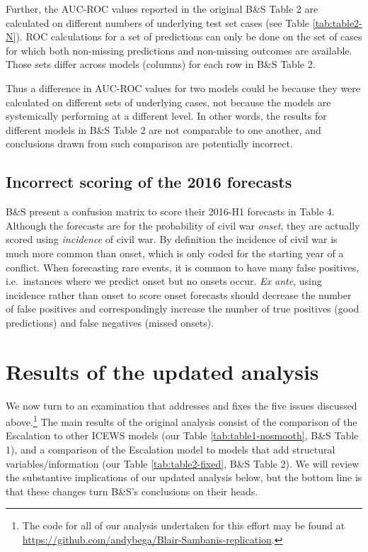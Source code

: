 \documentclass[
]{article}
\begin{document}
Further, the AUC-ROC values reported in the original B\&S Table 2 are calculated on different numbers of underlying test set cases (see Table \ref{tab:table2-N}). ROC calculations for a set of predictions can only be done on the set of cases for which both non-missing predictions and non-missing outcomes are available. Those sets differ across models (columns) for each row in B\&S Table 2.

Thus a difference in AUC-ROC values for two models could be because they were calculated on different sets of underlying cases, not because the models are systemically performing at a different level. In other words, the results for different models in B\&S Table 2 are not comparable to one another, and conclusions drawn from such comparison are potentially incorrect.

\hypertarget{incorrect-scoring-of-the-2016-forecasts}{%
\subsection{Incorrect scoring of the 2016 forecasts}\label{incorrect-scoring-of-the-2016-forecasts}}

B\&S present a confusion matrix to score their 2016-H1 forecasts in Table 4. Although the forecasts are for the probability of civil war \emph{onset}, they are actually scored using \emph{incidence} of civil war. By definition the incidence of civil war is much more common than onset, which is only coded for the starting year of a conflict. When forecasting rare events, it is common to have many false positives, i.e.~instances where we predict onset but no onsets occur. \emph{Ex ante}, using incidence rather than onset to score onset forecasts should decrease the number of false positives and correspondingly increase the number of true positives (good predictions) and false negatives (missed onsets).

\hypertarget{results-of-the-updated-analysis}{%
\section{Results of the updated analysis}\label{results-of-the-updated-analysis}}

We now turn to an examination that addresses and fixes the five issues discussed above.\footnote{The code for all of our analysis undertaken for this effort may be found at \url{https://github.com/andybega/Blair-Sambanis-replication}.} The main results of the original analysis consist of the comparison of the Escalation to other ICEWS models (our Table \ref{tab:table1-nosmooth}, B\&S Table 1), and a comparison of the Escalation model to models that add structural variables/information (our Table \ref{tab:table2-fixed}, B\&S Table 2). We will review the substantive implications of our updated analysis below, but the bottom line is that these changes turn B\&S's conclusions on their heads.
\end{document}
